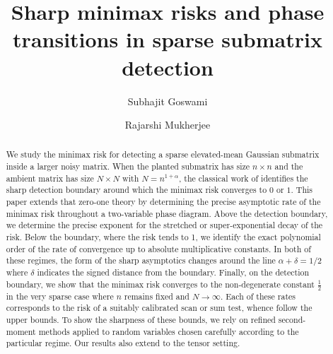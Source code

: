 \documentclass[11pt,reqno,letterpaper]{amsart}
\numberwithin{equation}{section}
\theoremstyle{plain}
\begin{document}
\title[Sharp risks for sparse submatrix detection]{Sharp minimax risks and phase transitions in sparse submatrix detection}

\author{Subhajit Goswami}
\address{School of Mathematics\\Tata Institute of Fundamental Research\\1, Homi Bhabha Road, Mumbai 400005, India}

\author{Rajarshi Mukherjee}
\address{Harvard T.H. Chan School of Public Health\\ Department of Biostatistics\\
	655 Huntington Avenue, Boston, MA 02115}

\begin{abstract}
We study the minimax risk for detecting a sparse elevated-mean Gaussian submatrix inside a larger noisy matrix. When the planted submatrix has size $n\times n$ and the ambient matrix has size $N\times N$ with $N = n^{1+\alpha}$, 
the classical work of \cite{butuceasubmatrix2013} identifies the sharp detection boundary 
around which the minimax risk converges to $0$ or $1$. This paper extends that zero-one theory by determining the precise asymptotic rate of the minimax risk throughout 
a two-variable phase diagram. Above the detection boundary, we determine the precise exponent for the stretched or super-exponential decay of the risk. Below the boundary, where the risk tends to 1, we identify the exact polynomial order of 
the rate of convergence up to absolute multiplicative constants. In both of these  regimes, the form of the sharp asymptotics changes around the line $\alpha + \delta = 1/2$ where 
$\delta$ indicates the signed distance from the boundary. Finally, on the detection 
boundary, we show that the minimax risk converges to the non-degenerate constant $\frac12$ in the very sparse case where $n$ remains fixed and $N \to \infty$. Each of these 
rates corresponds to the risk of a suitably calibrated scan or sum test, whence follow the 
upper bounds. To show the sharpness of these bounds, we rely on refined second-moment 
methods applied to random variables chosen carefully according to the particular regime. Our 
results also extend to the tensor setting.
\end{abstract}
\end{document}
